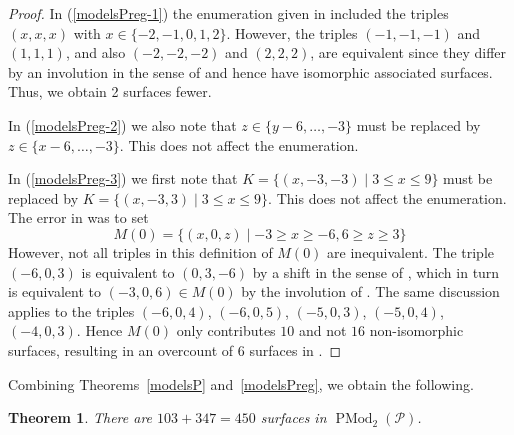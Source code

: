 \documentclass[11pt]{amsart}
\numberwithin{equation}{section}
\theoremstyle{plain}
\newtheorem{theorem}{Theorem}[section]
\theoremstyle{remark}
\newcommand{\PMod}{\operatorname{PMod}}
\begin{document}
\begin{proof}
In (\ref{modelsPreg-1}) the enumeration given in \cite{HL22} included the triples $(x,x,x)$ with $x\in\{-2,-1,0,1,2\}$. However, the triples $(-1,-1,-1)$ and $(1,1,1)$, and also $(-2,-2,-2)$ and $(2,2,2)$, are equivalent since they differ by an involution in the sense of \cite[Definition 7.9]{HL22} and hence have isomorphic associated surfaces. Thus, we obtain 2 surfaces fewer.

In (\ref{modelsPreg-2}) we also note that $z\in \{y-6,\ldots,-3\}$ must be replaced by $z\in \{x-6,\ldots,-3\}$. This does not affect the enumeration.

In (\ref{modelsPreg-3}) we first note that $K=\{(x,-3,-3)\mid 3\leq x\leq 9\}$ must be replaced by $K=\{(x,-3,3)\mid 3\leq x\leq 9\}$. This does not affect the enumeration.  The error in \cite{HL22} was to set
$$
M(0)=\{ (x,0,z) \mid -3\geq x \geq -6, 6\geq z\geq 3 \}
$$
However, not all triples in this definition of $M(0)$ are inequivalent. The triple $(-6, 0, 3)$ is equivalent to $(0, 3,-6)$ by a shift in the sense of \cite[Definition 7.9]{HL22}, which in turn is equivalent to $(-3,0,6) \in M(0)$ by the involution of \cite[Definition 7.9]{HL22}. The same discussion applies to the triples $(-6, 0, 4)$, $(-6, 0, 5)$, $(-5, 0, 3)$, $(-5, 0, 4)$, $(-4, 0, 3)$. Hence $M(0)$ only contributes $10$ and not $16$ non-isomorphic surfaces, resulting in an overcount of 6 surfaces in \cite{HL22}.
\end{proof}

Combining Theorems~\ref{modelsP} and~\ref{modelsPreg}, we obtain the following. 

\begin{theorem}
\label{the:allmodelsP}
There are $103+347=450$ surfaces in $\PMod_2(\mathscr{P})$.
\end{theorem}
\end{document}
